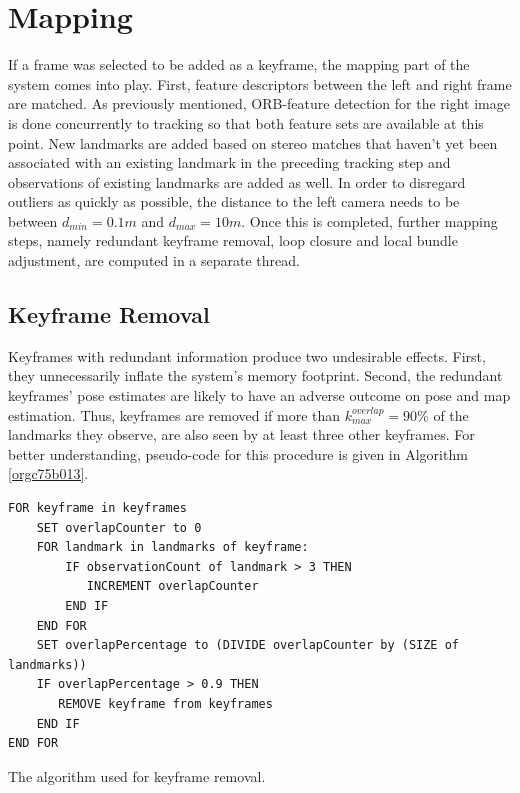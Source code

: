 \documentclass[a4paper, 10pt]{article}
\begin{document}
\section{Mapping}
\label{sec:orgef5bf86}
If a frame was selected to be added as a keyframe, the mapping part of the system comes into play. First, feature descriptors between the left and right frame are matched. 
As previously mentioned, ORB-feature detection for the right image is done concurrently to tracking so that both feature sets are available at this point. 
New landmarks are added based on stereo matches that haven’t yet been associated with an existing landmark in the preceding tracking step and observations of existing landmarks are added as well. 
In order to disregard outliers as quickly as possible, the distance to the left camera needs to be between \(d_{min}=0.1m\) and \(d_{max}=10m\).
Once this is completed, further mapping steps, namely redundant keyframe removal, loop closure and local bundle adjustment, are computed in a separate thread.

\subsection{Keyframe Removal}
\label{sec:orgc8b4df4}
Keyframes with redundant information produce two undesirable effects. First, they unnecessarily inflate the system’s memory footprint. Second, the redundant keyframes’ pose estimates are 
likely to have an adverse outcome on pose and map estimation.
Thus, keyframes are removed if more than \(k_{max}^{overlap}=90\%\) of the landmarks they observe, are also seen by at least three other keyframes. For better understanding, pseudo-code for this procedure 
is given in Algorithm \ref{orgc75b013}.

\begin{listing}
\begin{verbatim}
FOR keyframe in keyframes
    SET overlapCounter to 0
    FOR landmark in landmarks of keyframe:
        IF observationCount of landmark > 3 THEN
           INCREMENT overlapCounter
        END IF
    END FOR
    SET overlapPercentage to (DIVIDE overlapCounter by (SIZE of landmarks))
    IF overlapPercentage > 0.9 THEN
       REMOVE keyframe from keyframes
    END IF
END FOR
\end{verbatim}
\caption{\label{orgc75b013}
The algorithm used for keyframe removal.}
\end{listing}
\end{document}
